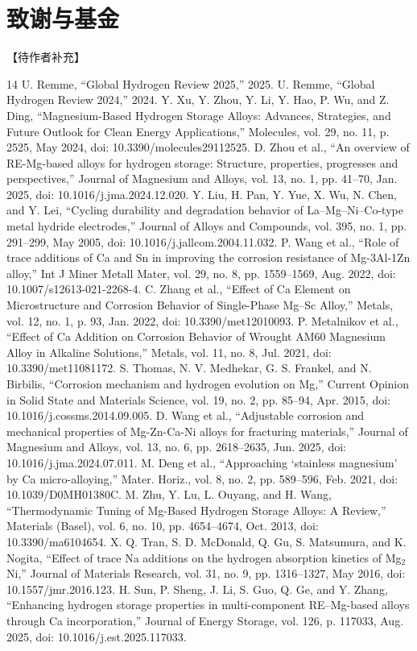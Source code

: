 \documentclass[preprint,12pt]{elsarticle}
\begin{document}
\section*{致谢与基金}
【待作者补充】

\begin{thebibliography}{14}
 U. Remme, “Global Hydrogen Review 2025,” 2025.
 U. Remme, “Global Hydrogen Review 2024,” 2024.
 Y. Xu, Y. Zhou, Y. Li, Y. Hao, P. Wu, and Z. Ding, “Magnesium-Based Hydrogen Storage Alloys: Advances, Strategies, and Future Outlook for Clean Energy Applications,” Molecules, vol. 29, no. 11, p. 2525, May 2024, doi: 10.3390/molecules29112525.
 D. Zhou et al., “An overview of RE-Mg-based alloys for hydrogen storage: Structure, properties, progresses and perspectives,” Journal of Magnesium and Alloys, vol. 13, no. 1, pp. 41–70, Jan. 2025, doi: 10.1016/j.jma.2024.12.020.
 Y. Liu, H. Pan, Y. Yue, X. Wu, N. Chen, and Y. Lei, “Cycling durability and degradation behavior of La–Mg–Ni–Co-type metal hydride electrodes,” Journal of Alloys and Compounds, vol. 395, no. 1, pp. 291–299, May 2005, doi: 10.1016/j.jallcom.2004.11.032.
 P. Wang et al., “Role of trace additions of Ca and Sn in improving the corrosion resistance of Mg-3Al-1Zn alloy,” Int J Miner Metall Mater, vol. 29, no. 8, pp. 1559–1569, Aug. 2022, doi: 10.1007/s12613-021-2268-4.
 C. Zhang et al., “Effect of Ca Element on Microstructure and Corrosion Behavior of Single-Phase Mg–Sc Alloy,” Metals, vol. 12, no. 1, p. 93, Jan. 2022, doi: 10.3390/met12010093.
 P. Metalnikov et al., “Effect of Ca Addition on Corrosion Behavior of Wrought AM60 Magnesium Alloy in Alkaline Solutions,” Metals, vol. 11, no. 8, Jul. 2021, doi: 10.3390/met11081172.
 S. Thomas, N. V. Medhekar, G. S. Frankel, and N. Birbilis, “Corrosion mechanism and hydrogen evolution on Mg,” Current Opinion in Solid State and Materials Science, vol. 19, no. 2, pp. 85–94, Apr. 2015, doi: 10.1016/j.cossms.2014.09.005.
 D. Wang et al., “Adjustable corrosion and mechanical properties of Mg-Zn-Ca-Ni alloys for fracturing materials,” Journal of Magnesium and Alloys, vol. 13, no. 6, pp. 2618–2635, Jun. 2025, doi: 10.1016/j.jma.2024.07.011.
 M. Deng et al., “Approaching ‘stainless magnesium’ by Ca micro-alloying,” Mater. Horiz., vol. 8, no. 2, pp. 589–596, Feb. 2021, doi: 10.1039/D0MH01380C.
 M. Zhu, Y. Lu, L. Ouyang, and H. Wang, “Thermodynamic Tuning of Mg-Based Hydrogen Storage Alloys: A Review,” Materials (Basel), vol. 6, no. 10, pp. 4654–4674, Oct. 2013, doi: 10.3390/ma6104654.
 X. Q. Tran, S. D. McDonald, Q. Gu, S. Matsumura, and K. Nogita, “Effect of trace Na additions on the hydrogen absorption kinetics of Mg$_2$Ni,” Journal of Materials Research, vol. 31, no. 9, pp. 1316–1327, May 2016, doi: 10.1557/jmr.2016.123.
 H. Sun, P. Sheng, J. Li, S. Guo, Q. Ge, and Y. Zhang, “Enhancing hydrogen storage properties in multi-component RE–Mg-based alloys through Ca incorporation,” Journal of Energy Storage, vol. 126, p. 117033, Aug. 2025, doi: 10.1016/j.est.2025.117033.
\end{thebibliography}
\end{document}
